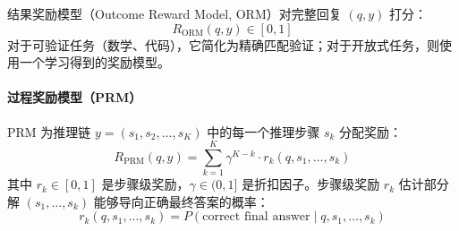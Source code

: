 结果奖励模型（Outcome Reward Model, ORM）对完整回复 $(q, y)$ 打分：
\begin{equation}
    R_{\text{ORM}}(q, y) \in [0, 1]
\end{equation}
对于可验证任务（数学、代码），它简化为精确匹配验证；对于开放式任务，则使用一个学习得到的奖励模型。

\paragraph{过程奖励模型（PRM）}
\label{process-reward-model-prm}

PRM 为推理链 $y = (s_1, s_2, \ldots, s_K)$ 中的每一个推理步骤 $s_k$ 分配奖励：
\begin{equation}
    R_{\text{PRM}}(q, y) = \sum_{k=1}^{K} \gamma^{K-k} \cdot r_k(q, s_1, \ldots, s_k)
\end{equation}
其中 $r_k \in [0,1]$ 是步骤级奖励，$\gamma \in (0,1]$ 是折扣因子。步骤级奖励 $r_k$ 估计部分解 $(s_1, \ldots, s_k)$ 能够导向正确最终答案的概率：
\begin{equation}
    r_k(q, s_1, \ldots, s_k) = P(\text{correct final answer} \mid q, s_1, \ldots, s_k)
\end{equation}

